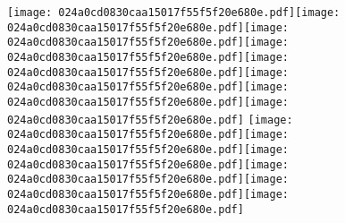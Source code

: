 \documentclass{article}
\newcommand{\origpg}[2]{\texttt{[image: 024a0cd0830caa15017f55f5f20e680e.pdf]}}
\begin{document}
{\vspace{30.373pt}{\fontsize{18pt}{21.6pt}\selectfont{}\hspace{234.73pt} }

\vspace{33.003pt}\hspace{135.94pt}\origpg1{221.25pt 586.52pt 235.74pt 606.52pt}\hspace{-0.52pt}\origpg1{235.22pt 586.52pt 249.9pt 606.52pt}\origpg1{249.9pt 586.52pt 262.12pt 606.52pt}\hspace{0.3pt}\origpg1{262.42pt 586.52pt 276.85pt 606.52pt}\origpg1{276.85pt 586.52pt 292.41pt 606.52pt}\hspace{0.1pt}\origpg1{292.51pt 586.52pt 305.84pt 606.52pt}\hspace{-1.06pt}\origpg1{304.78pt 586.52pt 319.22pt 606.52pt}\origpg1{319.22pt 586.52pt 333.66pt 606.52pt} \origpg1{338.74pt 586.52pt 350.95pt 606.52pt}\hspace{-2.579pt}\origpg1{348.37pt 586.52pt 362.81pt 606.52pt}\origpg1{362.81pt 586.52pt 376.03pt 606.52pt}\hspace{-0.2pt}\origpg1{375.83pt 586.52pt 391.38pt 606.52pt}\origpg1{391.46pt 586.52pt 404.8pt 606.52pt}\hspace{-0.8pt}\origpg1{404pt 586.52pt 418.43pt 606.52pt} 

}
\end{document}
